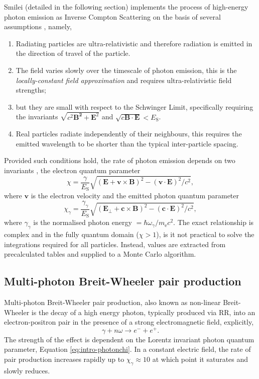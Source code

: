 Smilei (detailed in the following section) implements the process of high-energy photon emission as Inverse Compton Scattering on the basis of several assumptions \cite{nielQuantumClassicalModeling2018}, namely,
\begin{enumerate}
	\item Radiating particles are ultra-relativistic and therefore radiation is emitted in the direction of travel of the particle.
	\item The field varies slowly over the timescale of photon emission, this is the \textit{locally-constant field approximation} and requires ultra-relativistic field strengths;
	\item but they are small with respect to the Schwinger Limit, specifically requiring the invariants $\sqrt{c^2\mathbf{B^2} + \mathbf{E}^2}$ and $\sqrt{c\mathbf{B}\cdot\mathbf{E}} < E_\mathrm{S}$.
	\item Real particles radiate independently of their neighbours, this requires the emitted wavelength to be shorter than the typical inter-particle spacing.
\end{enumerate}
Provided such conditions hold, the rate of photon emission depends on two invariants \cite{ritusQuantumEffectsInteraction1985}, the electron quantum parameter
\begin{equation}
	\chi = \frac{\gamma}{E_\mathrm{S}}\sqrt{(\mathbf{E} + \mathbf{v}\times\mathbf{B})^2- (\mathbf{v}\cdot\mathbf{E})^2/c^2},
\end{equation}
where $\mathbf{v}$ is the electron velocity and the emitted photon quantum parameter
\begin{equation}\label{eq:intro-photonchi}
	\chi_\gamma = \frac{\gamma_\gamma}{E_\mathrm{S}}\sqrt{(\mathbf{E}_\perp + \mathbf{c}\times\mathbf{B})^2- (\mathbf{c}\cdot\mathbf{E})^2/c^2},
\end{equation}
where $\gamma_\gamma$ is the normalised photon energy $=\hbar \omega_\gamma /m_\mathrm{e}c^2$. The exact relationship is complex and in the fully quantum domain ($\chi > 1$), is it not practical to solve the integrations required for all particles. Instead, values are extracted from precalculated tables and supplied to a Monte Carlo algorithm. 

\subsection{Multi-photon Breit-Wheeler pair production}
Multi-photon Breit-Wheeler pair production, also known as non-linear Breit-Wheeler is the decay of a high energy photon, typically produced via \ac{RR}, into an electron-positron pair in the presence of a strong electromagnetic field, explicitly,
\begin{equation}
	\gamma + n\omega \to e^- + e^+.
\end{equation}
The strength of the effect is dependent on the Lorentz invariant photon quantum parameter, Equation \ref{eq:intro-photonchi}. In a constant electric field, the rate of pair production increases rapidly up to $\chi_\gamma \approx 10$ at which point it saturates and slowly reduces.

